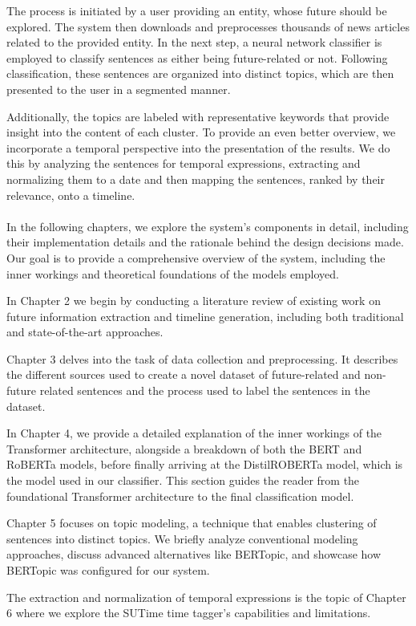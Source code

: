 \documentclass[a4paper,10pt]{report}
\begin{document}
The process is initiated by a user providing an entity, whose future should be explored. The system then downloads and preprocesses thousands of news articles related to the provided entity. In the next step, a neural network classifier is employed to classify sentences as either being future-related or not. Following classification, these sentences are organized into distinct topics, which are then presented to the user in a segmented manner. 

Additionally, the topics are labeled with representative keywords that provide insight into the content of each cluster. To provide an even better overview, we incorporate a temporal perspective into the presentation of the results. We do this by analyzing the sentences for temporal expressions, extracting and normalizing them to a date and then mapping the sentences, ranked by their relevance, onto a timeline. 
\\\\
In the following chapters, we explore the system's components in detail, including their implementation details and the rationale behind the design decisions made. Our goal is to provide a comprehensive overview of the system, including the inner workings and theoretical foundations of the models employed.

In Chapter 2 we begin by conducting a literature review of existing work on future information extraction and timeline generation, including both traditional and state-of-the-art approaches.

Chapter 3 delves into the task of data collection and preprocessing. It describes the different sources used to create a novel dataset of future-related and non-future related sentences and the process used to label the sentences in the dataset.

In Chapter 4, we provide a detailed explanation of the inner workings of the Transformer architecture, alongside a breakdown of both the BERT and RoBERTa models, before finally arriving at the DistilROBERTa model, which is the model used in our classifier. This section guides the reader from the foundational Transformer architecture to the final classification model.

Chapter 5 focuses on topic modeling, a technique that enables clustering of sentences into distinct topics. We briefly analyze conventional modeling approaches, discuss advanced alternatives like BERTopic, and showcase how BERTopic was configured for our system.

The extraction and normalization of temporal expressions is the topic of Chapter 6 where we explore the SUTime time tagger's capabilities and limitations.
\end{document}
